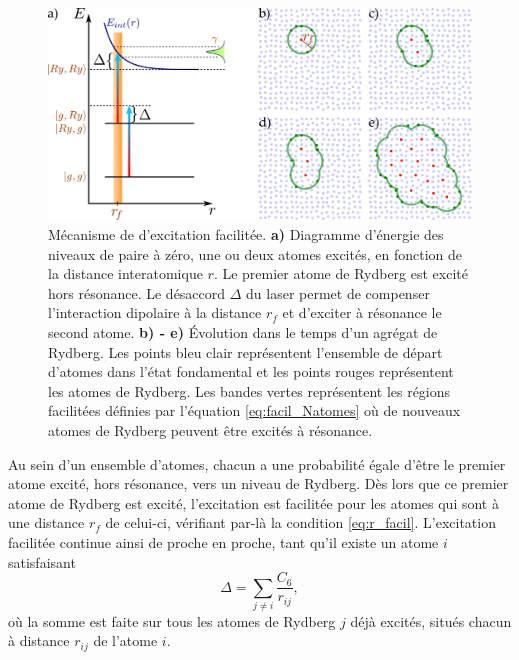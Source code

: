 \begin{figure}[!h]
\centering
\includegraphics[height=.3\textheight]{figures/low_l/dip_facil}
\caption[Mécanisme de d'excitation facilitée]{
Mécanisme de d'excitation facilitée.
\textbf{a)} Diagramme d'énergie des niveaux de paire à zéro, une ou deux atomes excités, en fonction de la distance interatomique $r$.
Le premier atome de Rydberg est excité hors résonance.
Le désaccord $\Delta$ du laser permet de compenser l'interaction dipolaire à la distance $r_f$ et d'exciter à résonance le second atome.
\textbf{b) - e)} Évolution dans le temps d'un agrégat de Rydberg.
Les points bleu clair représentent l'ensemble de départ d'atomes dans l'état fondamental et les points rouges représentent les atomes de Rydberg.
Les bandes vertes représentent les régions \og facilitées \fg{} définies par l'équation \eqref{eq:facil_Natomes} où de nouveaux atomes de Rydberg peuvent être excités à résonance.
}
\label{fig:dip_facil}
\end{figure}

Au sein d'un ensemble d'atomes, chacun a une probabilité égale d'être le premier atome excité, hors résonance, vers un niveau de Rydberg.
Dès lors que ce premier atome de Rydberg est excité, l'excitation est facilitée pour les atomes qui sont à une distance $r_f$ de celui-ci, vérifiant par-là la condition \eqref{eq:r_facil}.
L'excitation facilitée continue ainsi de proche en proche, tant qu'il existe un atome $i$ satisfaisant
\begin{equation}
\label{eq:facil_Natomes}
\Delta = \sum_{j\neq i} {\frac{C_6}{r_{ij}}},
\end{equation}
où la somme est faite sur tous les atomes de Rydberg $j$ déjà excités, situés chacun à distance $r_{ij}$ de l'atome $i$.

